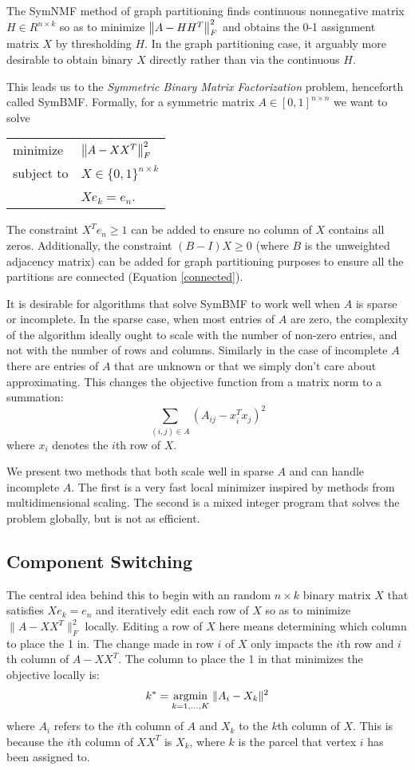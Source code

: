 The SymNMF method of graph partitioning finds continuous nonnegative
matrix $H \in R^{n \times k}$ so as to minimize $\left\lVert A - H H^T\right\rVert_F^2$
and obtains the 0-1 assignment matrix $X$ by thresholding $H$.
In the graph partitioning case, it arguably more desirable to obtain
binary $X$ directly rather than via the continuous $H$.

This leads us to the \textit{Symmetric Binary Matrix Factorization}
problem, henceforth called SymBMF. Formally, for a symmetric matrix
$A \in [0, 1]^{n \times n}$ we want to solve
\begin{center}
\begin{tabular}{l l}
minimize   & $\left\lVert A - X X^T\right\rVert_F^2$ \\
subject to & $X \in \{0, 1\}^{n \times k}$ \\
           & $X e_k = e_n$.
\end{tabular}
\end{center}
The constraint $X^T e_n \geq 1$ can be added to ensure no column of $X$
contains all zeros. Additionally, the constraint $(B - I) X \geq 0$
(where $B$ is the unweighted adjacency matrix) can be added for graph
partitioning purposes to ensure all the partitions are connected
(Equation \ref{connected}).

It is desirable for algorithms that solve SymBMF to work well when $A$
is sparse or incomplete. In the sparse case, when most entries of $A$
are zero, the complexity of the algorithm ideally ought to scale with
the number of non-zero entries, and not with the number of rows and
columns. Similarly in the case of incomplete $A$ there are entries of
$A$ that are unknown or that we simply don't care about approximating.
This changes the objective function from a matrix norm to a summation:
\[ \sum_{(i,j) \in A} (A_{ij} - x_i^T x_j)^2 \]
where $x_i$ denotes the $i$th row of $X$.

We present two methods that both scale well in sparse $A$ and can
handle incomplete $A$. The first is a very fast local minimizer
inspired by methods from multidimensional scaling. The second is a
mixed integer program that solves the problem globally, but is not
as efficient.

\subsection{Component Switching}

The central idea behind this to begin with an random $n \times k$
binary matrix $X$ that satisfies $X e_k = e_n$ and iteratively
edit each row of $X$ so as to minimize $\|A - X X^T\|_F^2$ locally.
Editing a row of $X$ here means determining which column to place the 1
in. The change made in row $i$ of $X$ only impacts the $i$th row and
$i$th column of $A - X X^T$. The column to place the 1 in that minimizes
the objective locally is:
\begin{equation} \label{col_select}
k^* = \underset{k = 1,...,K}{\mathrm{arg min}}\; \|A_i - X_k\|^2
\end{equation}
where $A_i$ refers to the $i$th column of $A$ and $X_k$ to the $k$th
column of $X$. This is because the $i$th column of $X X^T$ is $X_k$,
where $k$ is the parcel that vertex $i$ has been assigned to.

